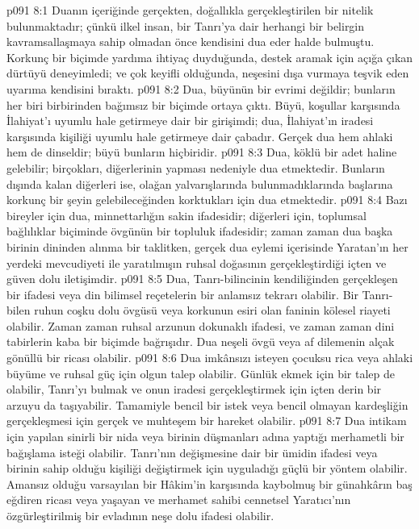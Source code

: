 \vs p091 8:1 Duanın içeriğinde gerçekten, doğallıkla gerçekleştirilen bir nitelik bulunmaktadır; çünkü ilkel insan, bir Tanrı’ya dair herhangi bir belirgin kavramsallaşmaya sahip olmadan önce kendisini dua eder halde bulmuştu. Korkunç bir biçimde yardıma ihtiyaç duyduğunda, destek aramak için açığa çıkan dürtüyü deneyimledi; ve çok keyifli olduğunda, neşesini dışa vurmaya teşvik eden uyarıma kendisini bıraktı.
\vs p091 8:2 Dua, büyünün bir evrimi değildir; bunların her biri birbirinden bağımsız bir biçimde ortaya çıktı. Büyü, koşullar karşısında İlahiyat’ı uyumlu hale getirmeye dair bir girişimdi; dua, İlahiyat’ın iradesi karşısında kişiliği uyumlu hale getirmeye dair çabadır. Gerçek dua hem ahlaki hem de dinseldir; büyü bunların hiçbiridir.
\vs p091 8:3 Dua, köklü bir adet haline gelebilir; birçokları, diğerlerinin yapması nedeniyle dua etmektedir. Bunların dışında kalan diğerleri ise, olağan yalvarışlarında bulunmadıklarında başlarına korkunç bir şeyin gelebileceğinden korktukları için dua etmektedir.
\vs p091 8:4 Bazı bireyler için dua, minnettarlığın sakin ifadesidir; diğerleri için, toplumsal bağlılıklar biçiminde övgünün bir topluluk ifadesidir; zaman zaman dua başka birinin dininden alınma bir taklitken, gerçek dua eylemi içerisinde Yaratan’ın her yerdeki mevcudiyeti ile yaratılmışın ruhsal doğasının gerçekleştirdiği içten ve güven dolu iletişimdir.
\vs p091 8:5 Dua, Tanrı\hyp{}bilincinin kendiliğinden gerçekleşen bir ifadesi veya din bilimsel reçetelerin bir anlamsız tekrarı olabilir. Bir Tanrı\hyp{}bilen ruhun coşku dolu övgüsü veya korkunun esiri olan faninin kölesel riayeti olabilir. Zaman zaman ruhsal arzunun dokunaklı ifadesi, ve zaman zaman dini tabirlerin kaba bir biçimde bağrışıdır. Dua neşeli övgü veya af dilemenin alçak gönüllü bir ricası olabilir.
\vs p091 8:6 Dua imkânsızı isteyen çocuksu rica veya ahlaki büyüme ve ruhsal güç için olgun talep olabilir. Günlük ekmek için bir talep de olabilir, Tanrı’yı bulmak ve onun iradesi gerçekleştirmek için içten derin bir arzuyu da taşıyabilir. Tamamiyle bencil bir istek veya bencil olmayan kardeşliğin gerçekleşmesi için gerçek ve muhteşem bir hareket olabilir.
\vs p091 8:7 Dua intikam için yapılan sinirli bir nida veya birinin düşmanları adına yaptığı merhametli bir bağışlama isteği olabilir. Tanrı’nın değişmesine dair bir ümidin ifadesi veya birinin sahip olduğu kişiliği değiştirmek için uyguladığı güçlü bir yöntem olabilir. Amansız olduğu varsayılan bir Hâkim’in karşısında kaybolmuş bir günahkârın baş eğdiren ricası veya yaşayan ve merhamet sahibi cennetsel Yaratıcı’nın özgürleştirilmiş bir evladının neşe dolu ifadesi olabilir.
